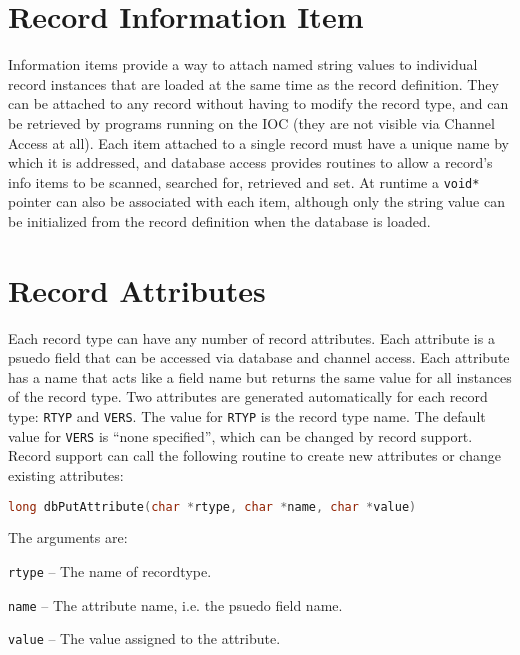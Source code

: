 \section{Record Information Item}
\label{Record Information Item}

Information items provide a way to attach named string values to individual record instances that are loaded at the same time as the record definition.
They can be attached to any record without having to modify the record type, and can be retrieved by programs running on the IOC (they are not visible via Channel Access at all).
Each item attached to a single record must have a unique name by which it is addressed, and database access provides routines to allow a record's info items to be scanned, searched for, retrieved and set.
At runtime a \verb|void*| pointer can also be associated with each item, although only the string value can be initialized from the record definition when the database is loaded.

\section{Record Attributes}

Each record type can have any number of record attributes.
Each attribute is a psuedo field that can be accessed via database and channel access.
Each attribute has a name that acts like a field name but returns the same value for all instances of the record type.
Two attributes are generated automatically for each record type: \verb|RTYP| and \verb|VERS|.
The value for \verb|RTYP| is the record type name.
The default value for \verb|VERS| is ``none specified'', which can be changed by record support.
Record support can call the following routine to create new attributes or change existing attributes:

\begin{lstlisting}[language=C]
long dbPutAttribute(char *rtype, char *name, char *value)
\end{lstlisting}

The arguments are:

\begin{description}
\item \verb|rtype| -- The name of recordtype.
\item \verb|name| -- The attribute name, i.e. the psuedo field name.
\item \verb|value| -- The value assigned to the attribute.
\end{description}

